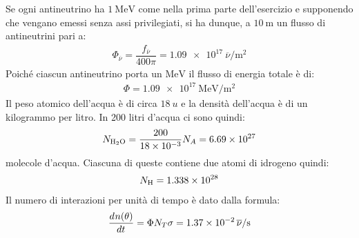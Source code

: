 \documentclass[../main.tex]{subfiles}
\begin{document}
\begin{svol}
		Se ogni antineutrino ha $ \SI{1}{\mega\electronvolt} $ come nella prima parte dell'esercizio e supponendo che vengano emessi senza assi privilegiati, si ha dunque, a $ \SI{10}{\meter} $ un flusso di antineutrini pari a:
		\begin{gather*}
		\Phi_{\overline{\nu}}=\dfrac{f_{\overline{\nu}}}{400\pi}=\SI{1.09e17}{\overline{\nu}\per\meter\squared}
		\end{gather*}
		Poiché ciascun antineutrino porta un $ \si{\mega\electronvolt} $ il flusso di energia totale è di:
		\begin{gather*}
		\Phi=\SI{1.09e17}{\mega\electronvolt\per\meter\squared}
		\end{gather*}
		Il peso atomico dell'acqua è di circa $ \SI{18}{u} $ e la densità dell'acqua è di un kilogrammo per litro. In 200 litri d'acqua ci sono quindi:
		\begin{gather*}
		N_{\mathrm{H_{2}O}}=\dfrac{200}{\num{18e-3}}N_{A}=\num{6.69e27}
		\end{gather*}
		molecole d'acqua. Ciascuna di queste contiene due atomi di idrogeno quindi:
		\begin{gather*}
		N_{\mathrm{H}}=\num{1.338e28}		\end{gather*}
		Il numero di interazioni per unità di tempo è dato dalla formula:
		\begin{gather*}
		\dfrac{d^{}n(\theta)}{dt^{}}=\Phi N_{T}\sigma=\SI{1.37e-2}{\overline{\nu}\per\second}
		\end{gather*}
	\end{svol}
\end{document}
